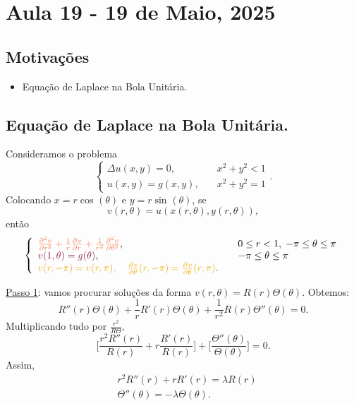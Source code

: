\documentclass[../pde_notes.tex]{subfiles}
\begin{document}
\section{Aula 19 - 19 de Maio, 2025}
\subsection{Motivações}
\begin{itemize}
	\item Equação de Laplace na Bola Unitária.
\end{itemize}
\subsection{Equação de Laplace na Bola Unitária.}
Consideramos o problema
\[
	\left\{\begin{array}{ll}
		\Delta u(x, y) = 0, & \quad x^{2}+y^{2}<1 \\
		u(x,y) = g(x,y),    & \quad x^{2}+y^{2}=1
	\end{array}\right..
\]
Colocando \(x = r\cos^{}{(\theta )}\) e \(y = r\sin^{}{(\theta )}\), se
\[
	v(r, \theta ) = u(x (r,\theta), y(r, \theta )),
\]
então
\[
	\left\{\begin{array}{ll}
		{\color{Sienna2}\frac{\partial^{2}v}{\partial r^{2}} + \frac{1}{r}\frac{\partial^{}v}{\partial r^{}} + \frac{1}{r^{2}}\frac{\partial^{2}v}{\partial \theta ^{2}}}, & \quad 0\leq r<1,\; -\pi \leq \theta \leq \pi \\
		{\color{VioletRed4} v(1, \theta ) = g(\theta )},                                                                                                                   & \quad -\pi \leq \theta \leq \pi              \\
		{\color{DarkGoldenrod2}v(r, -\pi ) = v(r, \pi ),\quad \frac{\partial^{}v}{\partial \theta ^{}}(r, -\pi ) = \frac{\partial^{}v}{\partial \theta ^{}}(r, \pi )}.
	\end{array}\right.
\]

{\color{Sienna2}\underline{Passo 1}}: vamos procurar soluções da forma \(v(r, \theta ) = R(r)\Theta (\theta )\). Obtemos:
\[
	R''(r)\Theta (\theta ) + \frac{1}{r}R'(r)\Theta (\theta ) + \frac{1}{r^{2}}R(r)\Theta ''(\theta ) = 0.
\]
Multiplicando tudo por \(\frac{r^{2}}{R\Theta },\)
\[
	\biggl[\frac{r^{2}R''(r)}{R(r)}+r \frac{R'(r)}{R(r)}\biggr] + \biggl[\frac{\Theta ''(\theta )}{\Theta (\theta )}\biggr] = 0.
\]
Assim,
\begin{align*}
	 & r^{2}R''(r) +rR'(r) = \lambda R(r)              \\
	 & \Theta ''(\theta ) = -\lambda \Theta (\theta ).
\end{align*}
\end{document}
